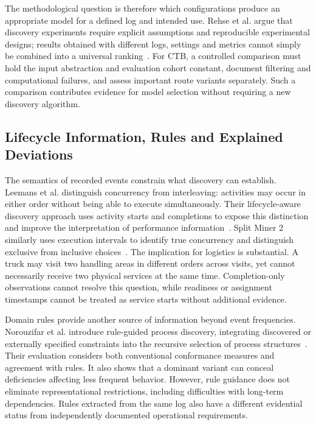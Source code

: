 The methodological question is therefore which configurations produce an appropriate model for a defined log and intended use. Rehse et al. argue that discovery experiments require explicit assumptions and reproducible experimental designs; results obtained with different logs, settings and metrics cannot simply be combined into a universal ranking~\cite{RWRehse2024Experimentation}. For CTB, a controlled comparison must hold the input abstraction and evaluation cohort constant, document filtering and computational failures, and assess important route variants separately. Such a comparison contributes evidence for model selection without requiring a new discovery algorithm.

\subsection{Lifecycle Information, Rules and Explained Deviations}

The semantics of recorded events constrain what discovery can establish. Leemans et al. distinguish concurrency from interleaving: activities may occur in either order without being able to execute simultaneously. Their lifecycle-aware discovery approach uses activity starts and completions to expose this distinction and improve the interpretation of performance information~\cite{RWLeemans2016Lifecycle}. Split Miner 2 similarly uses execution intervals to identify true concurrency and distinguish exclusive from inclusive choices~\cite{RWSplitMiner2Preprint}. The implication for logistics is substantial. A truck may visit two handling areas in different orders across visits, yet cannot necessarily receive two physical services at the same time. Completion-only observations cannot resolve this question, while readiness or assignment timestamps cannot be treated as service starts without additional evidence.

Domain rules provide another source of information beyond event frequencies. Norouzifar et al. introduce rule-guided process discovery, integrating discovered or externally specified constraints into the recursive selection of process structures~\cite{RWNorouzifar2026Rules}. Their evaluation considers both conventional conformance measures and agreement with rules. It also shows that a dominant variant can conceal deficiencies affecting less frequent behavior. However, rule guidance does not eliminate representational restrictions, including difficulties with long-term dependencies. Rules extracted from the same log also have a different evidential status from independently documented operational requirements.

